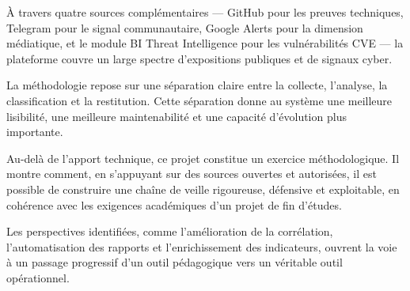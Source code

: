 \documentclass[12pt,a4paper]{report}
\begin{document}
À travers quatre sources complémentaires --- GitHub pour les preuves techniques, Telegram pour le signal communautaire, Google Alerts pour la dimension médiatique, et le module BI Threat Intelligence pour les vulnérabilités CVE --- la plateforme couvre un large spectre d'expositions publiques et de signaux cyber.

La méthodologie repose sur une séparation claire entre la collecte, l'analyse, la classification et la restitution. Cette séparation donne au système une meilleure lisibilité, une meilleure maintenabilité et une capacité d'évolution plus importante.

Au-delà de l'apport technique, ce projet constitue un exercice méthodologique. Il montre comment, en s'appuyant sur des sources ouvertes et autorisées, il est possible de construire une chaîne de veille rigoureuse, défensive et exploitable, en cohérence avec les exigences académiques d'un projet de fin d'études.

Les perspectives identifiées, comme l'amélioration de la corrélation, l'automatisation des rapports et l'enrichissement des indicateurs, ouvrent la voie à un passage progressif d'un outil pédagogique vers un véritable outil opérationnel. 

\end{document}
